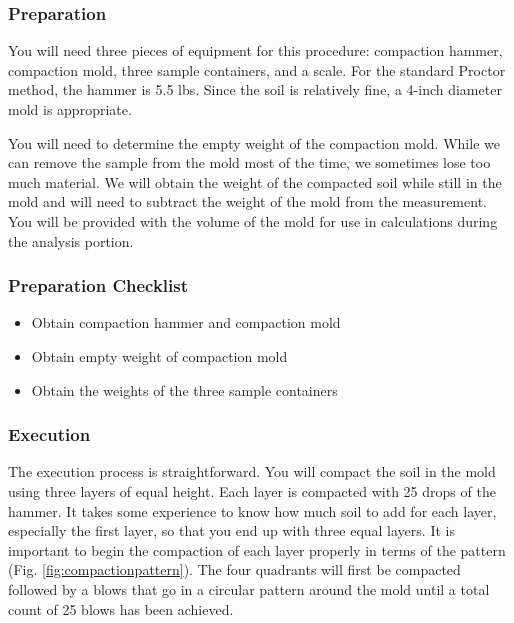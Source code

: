 \documentclass[12pt]{article}
\begin{document}
\subsubsection{Preparation}
You will need three pieces of equipment for this procedure: compaction hammer, compaction mold, three sample containers, and a scale. For the standard Proctor method, the hammer is 5.5 lbs. Since the soil is relatively fine, a 4-inch diameter mold is appropriate.

You will need to determine the empty weight of the compaction mold. While we can remove the sample from the mold most of the time, we sometimes lose too much material. We will obtain the weight of the compacted soil while still in the mold and will need to subtract the weight of the mold from the measurement. You will be provided with the volume of the mold for use in calculations during the analysis portion.

\subsubsection*{Preparation Checklist}
\begin{itemize}
    \item Obtain compaction hammer and compaction mold
    \item Obtain empty weight of compaction mold
    \item Obtain the weights of the three sample containers
\end{itemize}

\subsubsection{Execution}
The execution process is straightforward. You will compact the soil in the mold using three layers of equal height. Each layer is compacted with 25 drops of the hammer. It takes some experience to know how much soil to add for each layer, especially the first layer, so that you end up with three equal layers. It is important to begin the compaction of each layer properly in terms of the pattern (Fig. \ref{fig:compactionpattern}). The four quadrants will first be compacted followed by a blows that go in a circular pattern around the mold until a total count of 25 blows has been achieved.
\end{document}
